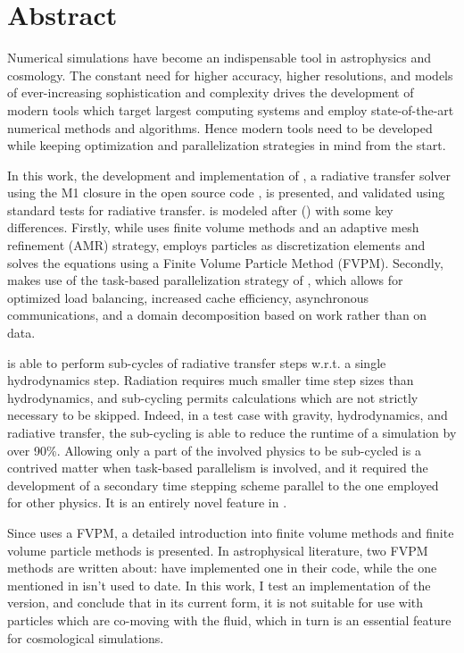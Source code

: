\cleardoublepage
\chapter*{Abstract}

Numerical simulations have become an indispensable tool in astrophysics and cosmology. The constant
need for higher accuracy, higher resolutions, and models of ever-increasing sophistication and
complexity drives the development of modern tools which target largest computing systems and employ
state-of-the-art numerical methods and algorithms. Hence modern tools need to be developed while
keeping optimization and parallelization strategies in mind from the start.

In this work, the development and implementation of \GEARRT, a radiative transfer solver using the
M1 closure in the open source code \swift, is presented, and validated using standard tests for
radiative transfer. \GEARRT is modeled after  (\cite{ramses-rt13}) with some key
differences. Firstly, while  uses finite volume methods and an adaptive mesh
refinement (AMR) strategy, \GEARRT employs particles as discretization elements and solves the
equations using a Finite Volume Particle Method (FVPM).
Secondly, \GEARRT makes use of the task-based parallelization strategy of \swift, which allows for
optimized load balancing, increased cache efficiency, asynchronous communications, and a domain
decomposition based on work rather than on data.

\GEARRT is able to perform sub-cycles of radiative transfer steps w.r.t. a single hydrodynamics
step. Radiation requires much smaller time step sizes than hydrodynamics, and sub-cycling permits
calculations which are not strictly necessary to be skipped. Indeed, in a test case with gravity,
hydrodynamics, and radiative transfer, the sub-cycling is able to reduce the runtime of a simulation
by over 90\%. Allowing only a part of the involved physics to be sub-cycled is a contrived matter
when task-based parallelism is involved, and it required the development of a secondary time
stepping scheme parallel to the one employed for other physics. It is an entirely novel feature
in \swift.

Since \GEARRT uses a FVPM, a detailed introduction into finite volume methods and finite volume
particle methods is presented. In astrophysical literature, two FVPM methods are written about:
\cite{hopkinsGIZMONewClass2015} have implemented one in their  code, while the one
mentioned in \cite{ivanovaCommonEnvelopeEvolution2013} isn't used to date. In this work, I test an
implementation of the \cite{ivanovaCommonEnvelopeEvolution2013} version, and conclude that in its
current form, it is not suitable for use with particles which are co-moving with the fluid, which
in turn is an essential feature for cosmological simulations.

